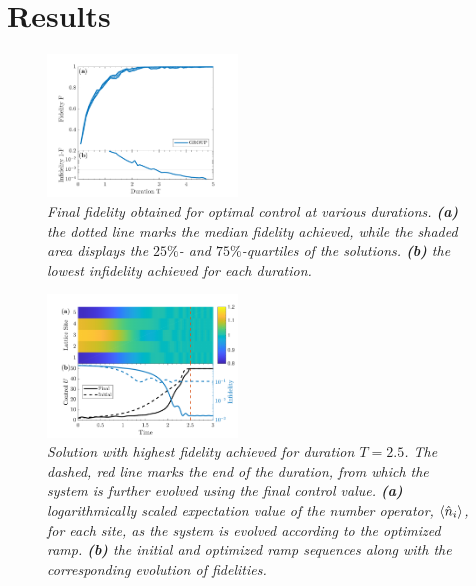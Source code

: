 \documentclass[%
 reprint,
 amsmath,amssymb,
 aps,
pra,
]{revtex4-1}
\begin{document}
\section{Results}


\begin{figure}[h!]
    \centering
    \includegraphics[width=0.45\textwidth]{Figures/FidelityDuration.pdf}
    \caption{\textit{Final fidelity obtained for optimal control at various durations. \textbf{(a)} the dotted line marks the median fidelity achieved, while the shaded area displays the $25\%$- and $75\%$-quartiles of the solutions. \textbf{(b)} the lowest infidelity achieved for each duration. }}
    \label{fig:FidelityDuration}
\end{figure}

\begin{figure}[h!]
    \centering
    \includegraphics[width=0.45\textwidth]{Figures/OptRamp.pdf}
    \caption{\textit{Solution with highest fidelity achieved for duration $T = 2.5$. The dashed, red line marks the end of the duration, from which the system is further evolved using the final control value. \textbf{(a)} logarithmically scaled expectation value of the number operator, $\braket{\hat{n}_i}$, for each site, as the system is evolved according to the optimized ramp. \textbf{(b)} the initial and optimized ramp sequences along with the corresponding evolution of fidelities.}}
    \label{fig:OptRamp}
\end{figure}
\end{document}
